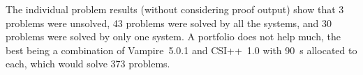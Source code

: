 \documentclass[aic]{iosart2x}
\newcommand{\LAST}{\mbox{CASC-30}}
\newcommand{\THIS}{\mbox{CASC-J13}}
\begin{document}
The individual problem results (without considering proof output) show that
3 problems were unsolved,
43 problems were solved by all the systems, and
30 problems were solved by only one system.
A portfolio does not help much, the best being a combination of Vampire~5.0.1 and CSI++~1.0
with 90~s allocated to each, which would solve 373 problems.

% 
% 
\end{document}
